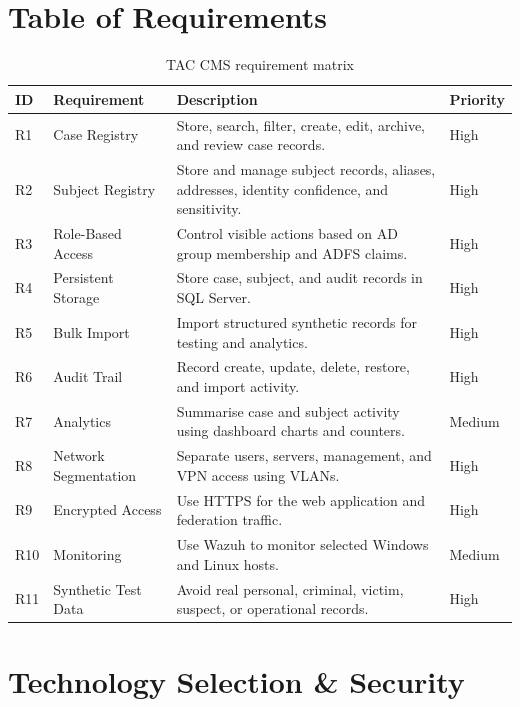 \raggedright

\section{Table of Requirements}

\vspace{-0.5cm}

\begin{table}[H]
\centering
\small
\renewcommand{\arraystretch}{1.1}
\begin{tabular}{|p{1.1cm}|p{3cm}|p{7cm}|p{1.8cm}|}
\hline
\textbf{ID} & \textbf{Requirement} & \textbf{Description} & \textbf{Priority} \\
\hline
R1 & Case Registry & Store, search, filter, create, edit, archive, and review case records. & High \\
\hline
R2 & Subject Registry & Store and manage subject records, aliases, addresses, identity confidence, and sensitivity. & High \\
\hline
R3 & Role-Based Access & Control visible actions based on AD group membership and ADFS claims. & High \\
\hline
R4 & Persistent Storage & Store case, subject, and audit records in SQL Server. & High \\
\hline
R5 & Bulk Import & Import structured synthetic records for testing and analytics. & High \\
\hline
R6 & Audit Trail & Record create, update, delete, restore, and import activity. & High \\
\hline
R7 & Analytics & Summarise case and subject activity using dashboard charts and counters. & Medium \\
\hline
R8 & Network Segmentation & Separate users, servers, management, and VPN access using VLANs. & High \\
\hline
R9 & Encrypted Access & Use HTTPS for the web application and federation traffic. & High \\
\hline
R10 & Monitoring & Use Wazuh to monitor selected Windows and Linux hosts. & Medium \\
\hline
R11 & Synthetic Test Data & Avoid real personal, criminal, victim, suspect, or operational records. & High \\
\hline
\end{tabular}
\caption{TAC CMS requirement matrix}
\end{table}

\section{Technology Selection \& Security}

